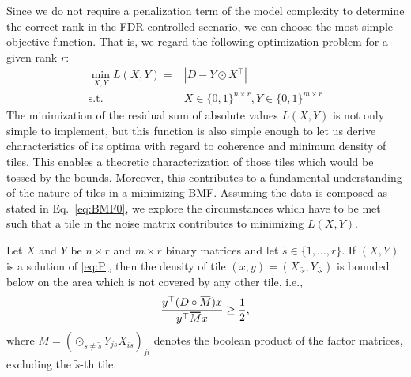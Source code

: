 Since we do not require a penalization term of the model complexity to determine the correct rank in the FDR controlled scenario, we can choose the most simple objective function. That is, we regard the following optimization problem for a given rank $r$:
\begin{equation}
\begin{aligned}
\min_{X,Y}L(X,Y)= &|D-Y\odot X^\top|\\
\text{s.t. }& X\in \{0,1\}^{n\times r}, Y\in\{0,1\}^{m\times r}
\end{aligned}
\tag{P}\label{eq:P}
\end{equation}
The minimization of the residual sum of absolute values $L(X,Y)$ is not only simple to implement, but this function is also simple enough to let us derive characteristics of its optima with regard to coherence and minimum density of tiles. This enables a theoretic characterization of those tiles which would be tossed by the bounds. Moreover, this contributes to a fundamental understanding of the nature of tiles in a minimizing BMF. Assuming the data is composed as stated in Eq.~\eqref{eq:BMF0}, we explore the circumstances which have to be met such that a tile in the noise matrix contributes to minimizing $L(X,Y)$.
\begin{lemma}\label{thm:minDensOverlap}
Let $X$ and $Y$ be $n\times r$ and $m\times r$ binary matrices and let $\tilde{s}\in\{1,\ldots,r\}$. If $(X,Y)$ is a solution of \eqref{eq:P}, then the density of tile $(x,y)=(X_{\cdot \tilde{s}},Y_{\cdot \tilde{s}})$ is bounded below on the area which is  not covered by any other tile, i.e.,
\begin{align}\label{eq:densOverlap}
\frac{y^\top (D\circ \thickbar{M})x}{y^\top \thickbar{M}x}
\geq \frac{1}{2},
\end{align}
where $M=\left(\odot_{s\neq \tilde{s}}Y_{j s}X_{i s}^\top\right)_{ji}$ denotes the boolean product of the factor matrices, excluding the $\tilde{s}$-th tile.
\end{lemma}
%
